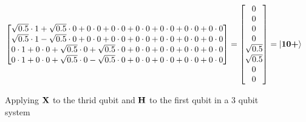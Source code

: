 \begin{figure}[H]
\begin{align*}
\begin{bmatrix}
            \sqrt{0.5}  \cdot 1 +  \sqrt{0.5} \cdot 0 +   0          \cdot 0 +   0          \cdot 0 +   0               \cdot 0 +          0          \cdot 0 +   0          \cdot 0 +   0         \cdot 0\\
            \sqrt{0.5}  \cdot 1   -\sqrt{0.5} \cdot 0 +   0          \cdot 0 +   0          \cdot 0 +   0               \cdot 0 +          0          \cdot 0 +   0          \cdot 0 +   0         \cdot 0\\
            0           \cdot 1 +  0          \cdot 0 +   \sqrt{0.5} \cdot 0 +   \sqrt{0.5} \cdot 0 +   0               \cdot 0 +          0          \cdot 0 +   0          \cdot 0 +   0         \cdot 0\\
            0           \cdot 1 +  0          \cdot 0 +   \sqrt{0.5} \cdot 0    -\sqrt{0.5} \cdot 0 +   0               \cdot 0 +          0          \cdot 0 +   0          \cdot 0 +   0         \cdot 0\\
        \end{bmatrix}
        =
        \begin{bmatrix}
            0\\
            0\\
            0\\
            0\\
            \sqrt{0.5}\\
            \sqrt{0.5}\\
            0\\
            0
        \end{bmatrix}
        &=
        \ket{\mathbf{1}\mathbf{0}\textbf{+}}
    \end{align*}
    \caption{Applying $\mathbf{X}$ to the thrid qubit and $\mathbf{H}$ to the first qubit in a 3 qubit system}
    \label{fig:app_applying_multiple_gates}
\end{figure}

